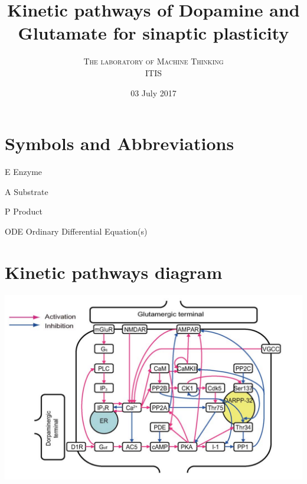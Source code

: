\documentclass[twoside,twocolumn]{article}
\title{Kinetic pathways of Dopamine and Glutamate for sinaptic plasticity}
\author{
\textsc{The laboratory of Machine Thinking} \\[1ex]
\normalsize ITIS
}
\date{03 July 2017}
\begin{document}
\maketitle


\section{Symbols and Abbreviations}
\begin{strip}
\begin{abbrv}
\item[E]                   Enzyme
\item[A]                   Substrate
\item[P]                   Product
\item[ODE]                 Ordinary Differential Equation(s)
\end{abbrv}
\end{strip}

\section{Kinetic pathways diagram}


\begin{strip}
    \centering\noindent
    \includegraphics[width=\textwidth,natwidth=1132,natheight=701]{dopamine-kinetic-diagram.png}
\end{strip}
\end{document}
